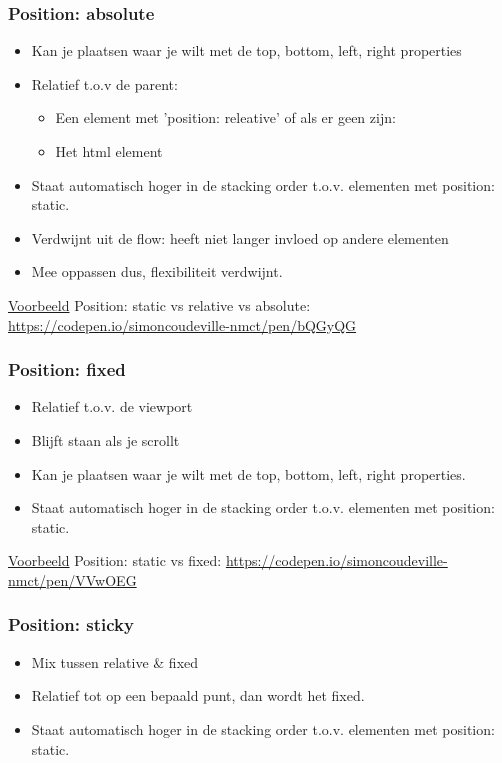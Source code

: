\documentclass{article}
\begin{document}
\subsubsection{Position: absolute}
\begin{itemize}
    \item Kan je plaatsen waar je wilt met de top, bottom, left, right properties
    \item Relatief t.o.v de parent:
    \begin{itemize}
        \item Een element met 'position: releative' of als er geen zijn:
        \item Het html element
    \end{itemize}
    \item Staat automatisch hoger in de stacking order t.o.v. elementen met position: static.
    \item Verdwijnt uit de flow: heeft niet langer invloed op andere elementen
    \item Mee oppassen dus, flexibiliteit verdwijnt.
\end{itemize}

\underline{Voorbeeld} Position: static vs relative vs absolute: \url{https://codepen.io/simoncoudeville-nmct/pen/bQGyQG}

\subsubsection{Position: fixed}
\begin{itemize}
    \item Relatief t.o.v. de viewport
    \item Blijft staan als je scrollt
    \item Kan je plaatsen waar je wilt met de top, bottom, left, right properties.
    \item Staat automatisch hoger in de stacking order t.o.v. elementen met position: static.
\end{itemize}

\underline{Voorbeeld} Position: static vs fixed: \url{https://codepen.io/simoncoudeville-nmct/pen/VVwOEG}

\subsubsection{Position: sticky}
\begin{itemize}
    \item Mix tussen relative \& fixed
    \item Relatief tot op een bepaald punt, dan wordt het fixed.
    \item Staat automatisch hoger in de stacking order t.o.v. elementen met position: static.
\end{itemize}
\end{document}
